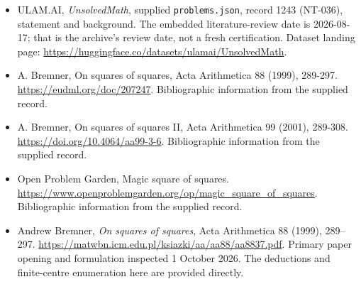 \documentclass[11pt,a4paper]{article}
\begin{document}
{\small

\begin{itemize}

\item[\hypertarget{source:1243:1}{S1}] ULAM.AI, \emph{UnsolvedMath}, supplied \texttt{problems.json}, record 1243 (NT-036), statement and background. The embedded literature-review date is 2026-08-17; that is the archive’s review date, not a fresh certification. Dataset landing page: \url{https://huggingface.co/datasets/ulamai/UnsolvedMath}.

\item[\hypertarget{source:1243:2}{S2}] A. Bremner, On squares of squares, Acta Arithmetica 88 (1999), 289-297. \url{https://eudml.org/doc/207247}. Bibliographic information from the supplied record.

\item[\hypertarget{source:1243:3}{S3}] A. Bremner, On squares of squares II, Acta Arithmetica 99 (2001), 289-308. \url{https://doi.org/10.4064/aa99-3-6}. Bibliographic information from the supplied record.

\item[\hypertarget{source:1243:4}{S4}] Open Problem Garden, Magic square of squares. \url{https://www.openproblemgarden.org/op/magic_square_of_squares}. Bibliographic information from the supplied record.


\item[E1] Andrew Bremner, \emph{On squares of squares},
Acta Arithmetica 88 (1999), 289--297.
\url{https://matwbn.icm.edu.pl/ksiazki/aa/aa88/aa8837.pdf}.
Primary paper opening and formulation inspected 1 October 2026.
The deductions and finite-centre enumeration here are provided directly.

\end{itemize}

}

\label{end:1243}
\end{document}

